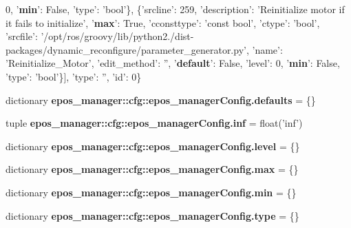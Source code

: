 \begin{DoxyCompactItemize}
0, '{\bf min}'\-: \-False, 'type'\-: 'bool'\}, \{'srcline'\-: 259, 'description'\-: '\-Reinitialize motor if it fails to initialize', '{\bf max}'\-: \-True, 'cconsttype'\-: 'const bool', 'ctype'\-: 'bool', 'srcfile'\-: '/opt/ros/groovy/lib/python2./dist-\/packages/dynamic\-\_\-reconfigure/parameter\-\_\-generator.\-py', 'name'\-: '\-Reinitialize\-\_\-\-Motor', 'edit\-\_\-method'\-: '', '{\bf default}'\-: \-False, 'level'\-: 0, '{\bf min}'\-: \-False, 'type'\-: 'bool'\}], 'type'\-: '', 'id'\-: 0\}
\item 
dictionary {\bf epos\-\_\-manager\-::cfg\-::epos\-\_\-manager\-Config.\-defaults} = \{\}
\item 
tuple {\bf epos\-\_\-manager\-::cfg\-::epos\-\_\-manager\-Config.\-inf} = float('inf')
\item 
dictionary {\bf epos\-\_\-manager\-::cfg\-::epos\-\_\-manager\-Config.\-level} = \{\}
\item 
dictionary {\bf epos\-\_\-manager\-::cfg\-::epos\-\_\-manager\-Config.\-max} = \{\}
\item 
dictionary {\bf epos\-\_\-manager\-::cfg\-::epos\-\_\-manager\-Config.\-min} = \{\}
\item 
dictionary {\bf epos\-\_\-manager\-::cfg\-::epos\-\_\-manager\-Config.\-type} = \{\}
\end{DoxyCompactItemize}
